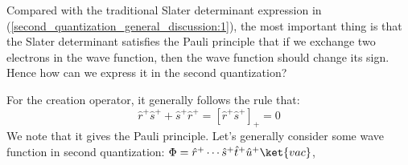 Compared with the traditional Slater determinant expression in
(\ref{second_quantization_general_discussion:1}), the most important thing is
that the Slater determinant satisfies the Pauli principle that if we exchange
two electrons in the wave function, then the wave function should change its
sign. Hence how can we express it in the second quantization?

For the creation operator, it generally follows the rule that:
\begin{equation}
  \label{second_quantization_general_discussion:2}
\hat{r}^{+}\hat{s}^{+} + \hat{s}^{+}\hat{r}^{+} = [\hat{r}^{+}\hat{s}^{+}]_{+}
= 0
\end{equation}
We note that it gives the Pauli principle. Let's generally consider some wave
function in second quantization: $\Phi
=\hat{r}^{+}\cdots\hat{s}^{+}\hat{t}^{+}\hat{u}^{+}\ket{vac}$, 





